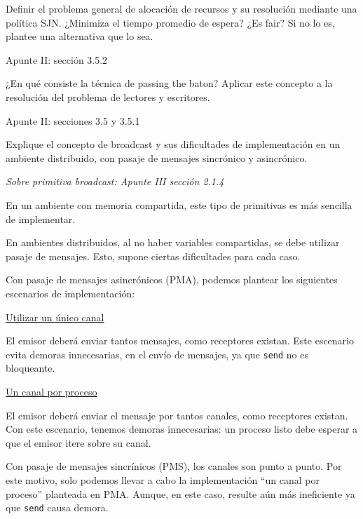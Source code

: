 \documentclass[a4paper, 10pt]{article}
\newenvironment{main_question}
	{\noindent\begin{enumerate}[resume=series-name]\bfseries}
	{\end{enumerate}}
\newenvironment{answer}
	{\noindent\par\normalfont}
	{}
\begin{document}
\begin{main_question}
\item Definir el problema general de alocación de recursos y su resolución mediante una política SJN. ¿Minimiza el tiempo promedio de espera? ¿Es fair? Si no lo es, plantee una alternativa que lo sea.
\end{main_question}
\begin{answer}
Apunte II: sección 3.5.2
\end{answer}
\begin{main_question}
\item ¿En qué consiste la técnica de passing the baton? Aplicar este concepto a la resolución del problema de lectores y escritores.
\end{main_question}
\begin{answer}
Apunte II: secciones 3.5 y 3.5.1
\end{answer}
\begin{main_question}
\item Explique el concepto de broadcast y sus dificultades de implementación en un ambiente distribuido, con pasaje de mensajes sincrónico y asincrónico.
\end{main_question}
\begin{answer}
\emph{Sobre primitiva broadcast: Apunte III sección 2.1.4}

En un ambiente con memoria compartida, este tipo de primitivas es más sencilla de implementar. 

En ambientes distribuidos, al no haber variables compartidas, se debe utilizar pasaje de mensajes. Esto, supone ciertas dificultades para cada caso.

Con pasaje de mensajes asincrónicos (PMA), podemos plantear los siguientes escenarios de implementación:

\underline{Utilizar un único canal}

El emisor deberá enviar tantos mensajes, como receptores existan. Este escenario evita demoras innecesarias, en el envío de mensajes, ya que \lstinline{send} no es bloqueante.

\underline{Un canal por proceso}

El emisor deberá enviar el mensaje por tantos canales, como receptores existan. Con este escenario, tenemos demoras innecesarias: un proceso listo debe esperar a que el emisor itere sobre su canal. 

Con pasaje de mensajes sincrínicos (PMS), los canales son punto a punto. Por este motivo, solo podemos llevar a cabo la implementación ``un canal por proceso'' planteada en PMA. Aunque, en este caso, resulte aún más ineficiente ya que \lstinline{send} causa demora.
\end{answer}
\end{document}
